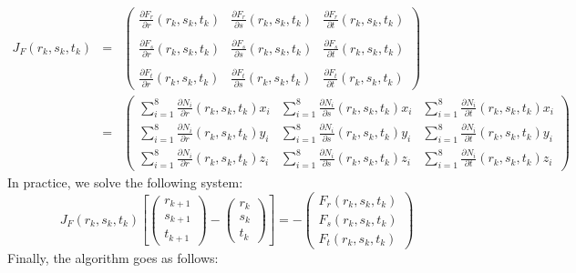 \begin{eqnarray}
J_F(r_k,s_k,t_k)
&=&
\left(
\begin{array}{ccc}
\frac{\partial F_r}{\partial r}(r_k,s_k,t_k) & \frac{\partial F_r}{\partial s}(r_k,s_k,t_k) & \frac{\partial F_r}{\partial t}(r_k,s_k,t_k) \\\\
\frac{\partial F_s}{\partial r}(r_k,s_k,t_k) & \frac{\partial F_s}{\partial s}(r_k,s_k,t_k) & \frac{\partial F_s}{\partial t}(r_k,s_k,t_k) \\\\
\frac{\partial F_t}{\partial r}(r_k,s_k,t_k) & \frac{\partial F_t}{\partial s}(r_k,s_k,t_k) & \frac{\partial F_t}{\partial t}(r_k,s_k,t_k) 
\end{array}
\right) \nonumber\\
&=&
\left(
\begin{array}{ccc}
\sum\limits_{i=1}^8 \frac{\partial N_i}{\partial r}(r_k,s_k,t_k) x_i &
\sum\limits_{i=1}^8 \frac{\partial N_i}{\partial s}(r_k,s_k,t_k) x_i &
\sum\limits_{i=1}^8 \frac{\partial N_i}{\partial t}(r_k,s_k,t_k) x_i \\
\sum\limits_{i=1}^8 \frac{\partial N_i}{\partial r}(r_k,s_k,t_k) y_i &
\sum\limits_{i=1}^8 \frac{\partial N_i}{\partial s}(r_k,s_k,t_k) y_i &
\sum\limits_{i=1}^8 \frac{\partial N_i}{\partial t}(r_k,s_k,t_k) y_i \\
\sum\limits_{i=1}^8 \frac{\partial N_i}{\partial r}(r_k,s_k,t_k) z_i &
\sum\limits_{i=1}^8 \frac{\partial N_i}{\partial s}(r_k,s_k,t_k) z_i &
\sum\limits_{i=1}^8 \frac{\partial N_i}{\partial t}(r_k,s_k,t_k) z_i 
\end{array}
\right) \nonumber 
\end{eqnarray}
In practice, we solve the following system:
\[
J_F(r_k,s_k,t_k) 
\left[  
\left(
\begin{array}{c}
r_{k+1} \\s_{k+1} \\ t_{k+1}
\end{array}
\right)
-
\left(
\begin{array}{c}
r_{k} \\s_{k} \\ t_{k}
\end{array}
\right)
\right]=-
\left(
\begin{array}{c}
F_r(r_k,s_k,t_k) \\
F_s(r_k,s_k,t_k)\\
F_t(r_k,s_k,t_k)
\end{array}
\right)
\]
Finally, the algorithm goes as follows:
